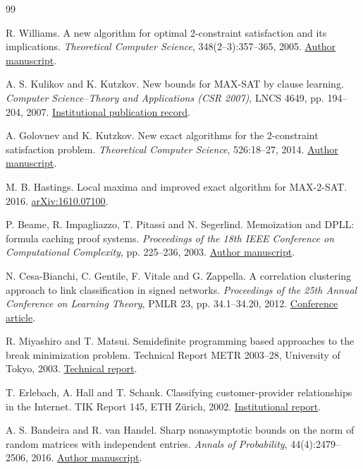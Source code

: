 \documentclass[11pt,a4paper]{article}
\theoremstyle{definition}
\theoremstyle{remark}
\begin{document}
\begin{thebibliography}{99}
\small\raggedright
\setlength{\itemsep}{3pt}\setlength{\parsep}{0pt}
R. Williams. A new algorithm for optimal 2-constraint satisfaction and its
implications. \emph{Theoretical Computer Science}, 348(2--3):357--365, 2005.
\href{https://www.cs.cmu.edu/~ryanw/2-csp-final.pdf}{Author manuscript}.

A. S. Kulikov and K. Kutzkov. New bounds for MAX-SAT by clause learning.
\emph{Computer Science--Theory and Applications (CSR 2007)},
LNCS 4649, pp. 194--204, 2007.
\href{https://www.pdmi.ras.ru/pdmi/publications/2007}{Institutional publication record}.

A. Golovnev and K. Kutzkov. New exact algorithms for the 2-constraint
satisfaction problem. \emph{Theoretical Computer Science}, 526:18--27, 2014.
\href{https://www.golovnev.org/papers/max2csp.pdf}{Author manuscript}.

M. B. Hastings. Local maxima and improved exact algorithm for MAX-2-SAT.
2016. \href{https://arxiv.org/abs/1610.07100}{arXiv:1610.07100}.

P. Beame, R. Impagliazzo, T. Pitassi and N. Segerlind.
Memoization and DPLL: formula caching proof systems.
\emph{Proceedings of the 18th IEEE Conference on Computational Complexity},
pp. 225--236, 2003.
\href{https://homes.cs.washington.edu/~beame/papers/caching.pdf}{Author manuscript}.

N. Cesa-Bianchi, C. Gentile, F. Vitale and G. Zappella.
A correlation clustering approach to link classification in signed networks.
\emph{Proceedings of the 25th Annual Conference on Learning Theory},
PMLR 23, pp. 34.1--34.20, 2012.
\href{https://proceedings.mlr.press/v23/cesa-bianchi12.html}{Conference article}.

R. Miyashiro and T. Matsui.
Semidefinite programming based approaches to the break minimization problem.
Technical Report METR 2003--28, University of Tokyo, 2003.
\href{https://www.keisu.t.u-tokyo.ac.jp/data/2003/METR03-28.pdf}{Technical report}.

T. Erlebach, A. Hall and T. Schank.
Classifying customer-provider relationships in the Internet.
TIK Report 145, ETH Z\"urich, 2002.
\href{https://doi.org/10.3929/ethz-a-004403617}{Institutional report}.

A. S. Bandeira and R. van Handel.
Sharp nonasymptotic bounds on the norm of random matrices with independent
entries. \emph{Annals of Probability}, 44(4):2479--2506, 2016.
\href{https://arxiv.org/abs/1408.6185}{Author manuscript}.


\end{thebibliography}
\end{document}
